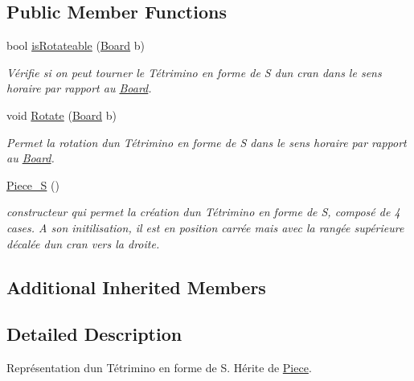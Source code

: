 \subsection*{Public Member Functions}
\begin{DoxyCompactItemize}
\item 
bool \hyperlink{classPiece__S_a725b9e7b154628e035bcc7ebd2a3ec9f}{is\+Rotateable} (\hyperlink{classBoard}{Board} b)
\begin{DoxyCompactList}\small\item\em Vérifie si on peut tourner le Tétrimino en forme de S d\textquotesingle{}un cran dans le sens horaire par rapport au \hyperlink{classBoard}{Board}. \end{DoxyCompactList}\item 
void \hyperlink{classPiece__S_aefb2837f39f6b05bc678a3fdadc192b0}{Rotate} (\hyperlink{classBoard}{Board} b)
\begin{DoxyCompactList}\small\item\em Permet la rotation d\textquotesingle{}un Tétrimino en forme de S dans le sens horaire par rapport au \hyperlink{classBoard}{Board}. \end{DoxyCompactList}\item 
\mbox{\label{classPiece__S_aa39b8ee3dd219a03af2c6e0b3d05be5c}} 
\hyperlink{classPiece__S_aa39b8ee3dd219a03af2c6e0b3d05be5c}{Piece\+\_\+S} ()
\begin{DoxyCompactList}\small\item\em constructeur qui permet la création d\textquotesingle{}un Tétrimino en forme de S, composé de 4 cases. A son initilisation, il est en position carrée mais avec la rangée supérieure décalée d\textquotesingle{}un cran vers la droite. \end{DoxyCompactList}\end{DoxyCompactItemize}
\subsection*{Additional Inherited Members}


\subsection{Detailed Description}
Représentation d\textquotesingle{}un Tétrimino en forme de S. Hérite de \hyperlink{classPiece}{Piece}. 

